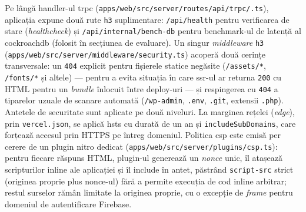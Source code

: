 Pe lângă handler-ul \gls{trpc} (\texttt{apps/\allowbreak web/\allowbreak src/\allowbreak server/\allowbreak routes/\allowbreak api/\allowbreak trpc/\allowbreak [trpc].ts}), aplicația expune două rute \texttt{h3} suplimentare: \texttt{/api/health} pentru verificarea de stare (\textit{healthcheck}) și \texttt{/api/internal/bench-db} pentru benchmark-ul de latență al \gls{cockroachdb} (folosit în secțiunea de evaluare). Un singur \textit{middleware} \texttt{h3} (\texttt{apps/web/src/server/\allowbreak middleware/security.ts}) acoperă două cerințe transversale: un \texttt{404} explicit pentru fișierele statice negăsite (\texttt{/assets/*}, \texttt{/fonts/*} și altele) --- pentru a evita situația în care \acrshort{ssr}-ul ar returna \texttt{200} cu HTML pentru un \textit{bundle} înlocuit între deploy-uri --- și respingerea cu \texttt{404} a tiparelor uzuale de scanare automată (\texttt{/wp-admin}, \texttt{.env}, \texttt{.git}, extensii \texttt{.php}). Antetele de securitate sunt aplicate pe două niveluri. La marginea rețelei (\textit{edge}), prin \texttt{vercel.json}, se aplică \gls{hsts} cu durată de un an și \texttt{includeSubDomains}, care forțează accesul prin HTTPS pe întreg domeniul. Politica \gls{csp} este emisă per cerere de un plugin \gls{nitro} dedicat (\texttt{apps/\allowbreak web/\allowbreak src/\allowbreak server/\allowbreak plugins/\allowbreak csp.ts}): pentru fiecare răspuns HTML, plugin-ul generează un \textit{nonce} unic, îl atașează scripturilor inline ale aplicației și îl include în antet, păstrând \texttt{script-src} strict (originea proprie plus nonce-ul) fără a permite execuția de cod inline arbitrar; restul surselor rămân limitate la originea proprie, cu o excepție de \textit{frame} pentru domeniul de autentificare Firebase.

